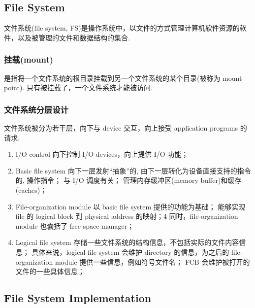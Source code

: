 \subsection{File System}
文件系统(file system, FS)是操作系统中，以文件的方式管理计算机软件资源的软件，以及被管理的文件和数据结构的集合. 

\subsubsection{挂载(mount)}
是指将一个文件系统的根目录挂载到另一个文件系统的某个目录(被称为 mount point). 只有被挂载了，一个文件系统才能被访问. 

\subsubsection{文件系统分层设计}
文件系统被分为若干层，向下与 device 交互，向上接受 application programs 的请求. 
\begin{enumerate}\small
    \item I/O control
    \subitem 向下控制 I/O devices，向上提供 I/O 功能；
    \item Basic file system
    \subitem 向下一层发射``抽象''的, 由下一层转化为设备直接支持的指令的, 操作指令；
    \subitem 与 I/O 调度有关；
    \subitem 管理内存缓冲区(memory buffer)和缓存(caches)；
    \item File-organization module
    \subitem 以 basic file system 提供的功能为基础；
    \subitem 能够实现 file 的 logical block 到 physical address 的映射；4
    \subitem 同时，file-organization module 也囊括了 free-space manager；
    \item Logical file system
    \subitem 存储一些文件系统的结构信息，不包括实际的文件内容信息；
    \subitem 具体来说，logical file system 会维护 directory 的信息，为之后的 file-organization module 提供一些信息，例如符号文件名；
    \subitem FCB 会维护被打开的文件的一些具体信息；
\end{enumerate}

\subsection{File System Implementation}


